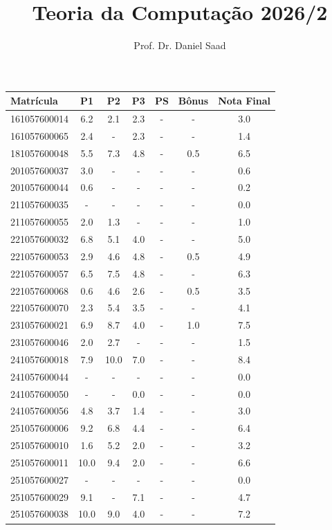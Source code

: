 \documentclass[a4paper]{article}
\title{ Teoria da Computação 2026/2}
\date{}
\author{ Prof. Dr. Daniel Saad}
\begin{document}
 \maketitle
    \begin{longtable}{|l|c|c|c|c|c|c|}
    \hline
Matrícula & P1 & P2 & P3 & PS & Bônus & Nota Final\\\hline \endhead   
161057600014 & 6.2 & 2.1 & 2.3 & - & - & 3.0\\\hline
161057600065 & 2.4 & - & 2.3 & - & - & 1.4\\\hline
181057600048 & 5.5 & 7.3 & 4.8 & - & 0.5 & 6.5\\\hline
201057600037 & 3.0 & - & - & - & - & 0.6\\\hline
201057600044 & 0.6 & - & - & - & - & 0.2\\\hline
211057600035 & - & - & - & - & - & 0.0\\\hline
211057600055 & 2.0 & 1.3 & - & - & - & 1.0\\\hline
221057600032 & 6.8 & 5.1 & 4.0 & - & - & 5.0\\\hline
221057600053 & 2.9 & 4.6 & 4.8 & - & 0.5 & 4.9\\\hline
221057600057 & 6.5 & 7.5 & 4.8 & - & - & 6.3\\\hline
221057600068 & 0.6 & 4.6 & 2.6 & - & 0.5 & 3.5\\\hline
221057600070 & 2.3 & 5.4 & 3.5 & - & - & 4.1\\\hline
231057600021 & 6.9 & 8.7 & 4.0 & - & 1.0 & 7.5\\\hline
231057600046 & 2.0 & 2.7 & - & - & - & 1.5\\\hline
241057600018 & 7.9 & 10.0 & 7.0 & - & - & 8.4\\\hline
241057600044 & - & - & - & - & - & 0.0\\\hline
241057600050 & - & - & 0.0 & - & - & 0.0\\\hline
241057600056 & 4.8 & 3.7 & 1.4 & - & - & 3.0\\\hline
251057600006 & 9.2 & 6.8 & 4.4 & - & - & 6.4\\\hline
251057600010 & 1.6 & 5.2 & 2.0 & - & - & 3.2\\\hline
251057600011 & 10.0 & 9.4 & 2.0 & - & - & 6.6\\\hline
251057600027 & - & - & - & - & - & 0.0\\\hline
251057600029 & 9.1 & - & 7.1 & - & - & 4.7\\\hline
251057600038 & 10.0 & 9.0 & 4.0 & - & - & 7.2\\\hline

\end{longtable}
\end{document}
